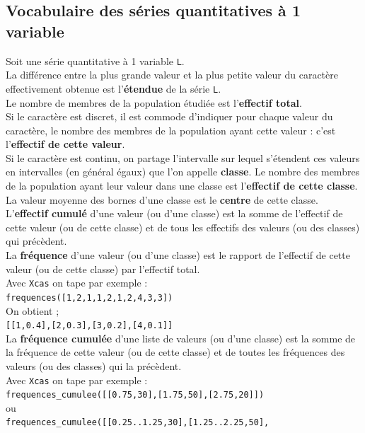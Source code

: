 \documentclass[a4paper,11pt]{book}
\begin{document}
\subsection{Vocabulaire des s\'eries quantitatives \`a 1 variable}
Soit une s\'erie quantitative \`a 1 variable {\tt L}.\\
La diff\'erence entre la plus grande valeur et la plus petite valeur du 
caract\`ere effectivement obtenue est l'{\bf \'etendue} de la s\'erie {\tt L}.\\
Le nombre de membres de la population \'etudi\'ee est l'{\bf effectif total}.\\
Si le caract\`ere est discret, il est commode d'indiquer pour chaque valeur du 
caract\`ere, le nombre des membres de la population ayant cette valeur : c'est 
l'{\bf effectif de cette valeur}.\\ 
Si le caract\`ere est continu, on partage l'intervalle sur lequel s'\'etendent
ces valeurs en intervalles (en g\'en\'eral \'egaux) que l'on appelle 
{\bf classe}. Le nombre des membres de la population ayant leur valeur dans une
 classe est l'{\bf effectif de cette classe}.\\ 
La valeur moyenne des bornes d'une classe est le {\bf centre} de cette 
classe.\\
L'{\bf effectif cumul\'e} d'une valeur (ou d'une classe) est la somme de
l'effectif de cette valeur (ou de cette classe) et de tous les effectifs des 
valeurs (ou des classes) qui pr\'ec\`edent.\\
 La {\bf fr\'equence} d'une valeur (ou d'une classe) est le rapport de  
l'effectif de cette valeur (ou de cette classe) par l'effectif total.\\
Avec {\tt Xcas} on tape par exemple :\\
{\tt frequences([1,2,1,1,2,1,2,4,3,3])}\\
On obtient ;\\
{\tt [[1,0.4],[2,0.3],[3,0.2],[4,0.1]]}\\
La {\bf fr\'equence cumul\'ee} d'une liste de valeurs (ou d'une classe) est la 
somme de la fr\'equence de cette valeur (ou de cette classe) et de toutes les 
fr\'equences des valeurs (ou des classes) qui la pr\'ec\`edent.\\
Avec {\tt Xcas} on tape par exemple :\\
{\tt frequences\_cumulee([[0.75,30],[1.75,50],[2.75,20]])}\\
ou \\
{\tt frequences\_cumulee([[0.25..1.25,30],[1.25..2.25,50],}\\
\end{document}
